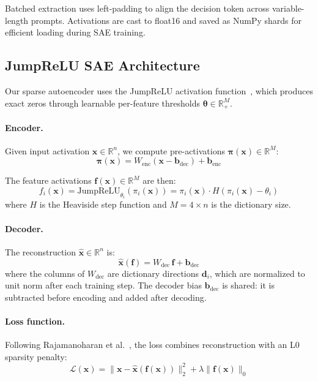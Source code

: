 \documentclass[runningheads]{llncs}
\begin{document}
Batched extraction uses left-padding to align the decision token across variable-length prompts. Activations are cast to float16 and saved as NumPy shards for efficient loading during SAE training.

\subsection{JumpReLU SAE Architecture}

Our sparse autoencoder uses the JumpReLU activation function~\cite{ref_rajamanoharan2024}, which produces exact zeros through learnable per-feature thresholds $\boldsymbol{\theta} \in \mathbb{R}^M_+$.

\paragraph{Encoder.} Given input activation $\mathbf{x} \in \mathbb{R}^n$, we compute pre-activations $\boldsymbol{\pi}(\mathbf{x}) \in \mathbb{R}^M$:
\begin{equation}
\boldsymbol{\pi}(\mathbf{x}) = W_\text{enc}(\mathbf{x} - \mathbf{b}_\text{dec}) + \mathbf{b}_\text{enc}
\end{equation}

The feature activations $\mathbf{f}(\mathbf{x}) \in \mathbb{R}^M$ are then:
\begin{equation}
f_i(\mathbf{x}) = \text{JumpReLU}_{\theta_i}(\pi_i(\mathbf{x})) = \pi_i(\mathbf{x}) \cdot H(\pi_i(\mathbf{x}) - \theta_i)
\end{equation}
where $H$ is the Heaviside step function and $M = 4 \times n$ is the dictionary size.

\paragraph{Decoder.} The reconstruction $\hat{\mathbf{x}} \in \mathbb{R}^n$ is:
\begin{equation}
\hat{\mathbf{x}}(\mathbf{f}) = W_\text{dec}\,\mathbf{f} + \mathbf{b}_\text{dec}
\end{equation}
where the columns of $W_\text{dec}$ are dictionary directions $\mathbf{d}_i$, which are normalized to unit norm after each training step. The decoder bias $\mathbf{b}_\text{dec}$ is shared: it is subtracted before encoding and added after decoding.

\paragraph{Loss function.} Following Rajamanoharan et al.~\cite{ref_rajamanoharan2024}, the loss combines reconstruction with an L0 sparsity penalty:
\begin{equation}
\mathcal{L}(\mathbf{x}) = \|\mathbf{x} - \hat{\mathbf{x}}(\mathbf{f}(\mathbf{x}))\|_2^2 + \lambda \|\mathbf{f}(\mathbf{x})\|_0
\end{equation}
\end{document}
